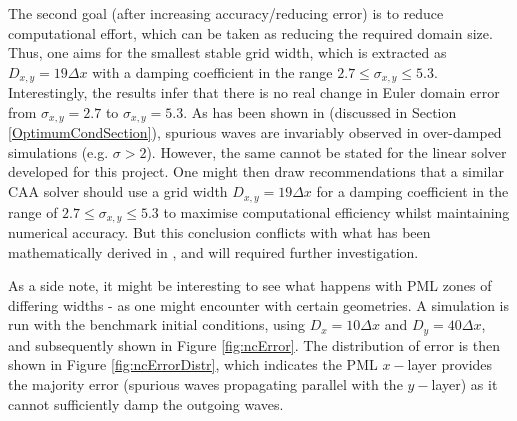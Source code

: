The second goal (after increasing accuracy/reducing error) is to reduce computational effort, which can be taken as reducing the required domain size. Thus, one aims for the smallest stable grid width, which is extracted as $D_{x,y}=19 \Delta x$ with a damping coefficient in the range $2.7 \leq \sigma_{x,y} \leq 5.3$. Interestingly, the results infer that there is no real change in Euler domain error from $\sigma_{x,y}=2.7$ to $\sigma_{x,y}=5.3$. As has been shown in \cite{choung2018nonreflective} (discussed in Section \ref{OptimumCondSection}), spurious waves are invariably observed in over-damped simulations (e.g. $\sigma > 2$). However, the same cannot be stated for the linear solver developed for this project. One might then draw recommendations that a similar CAA solver should use a grid width $D_{x,y}=19 \Delta x$ for a damping coefficient in the range of $2.7 \leq \sigma_{x,y} \leq 5.3$ to maximise computational efficiency whilst maintaining numerical accuracy. But this conclusion conflicts with what has been mathematically derived in \cite{choung2018nonreflective}, and will required further investigation.



As a side note, it might be interesting to see what happens with PML zones of differing widths - as one might encounter with certain geometries. A simulation is run with the benchmark initial conditions, using $D_x=10\Delta x$ and $D_y=40\Delta x$, and subsequently shown in Figure \ref{fig:ncError}. The distribution of error is then shown in Figure \ref{fig:ncErrorDistr}, which indicates the PML $x-$layer provides the majority error (spurious waves propagating parallel with the $y-$layer) as it cannot sufficiently damp the outgoing waves. 

